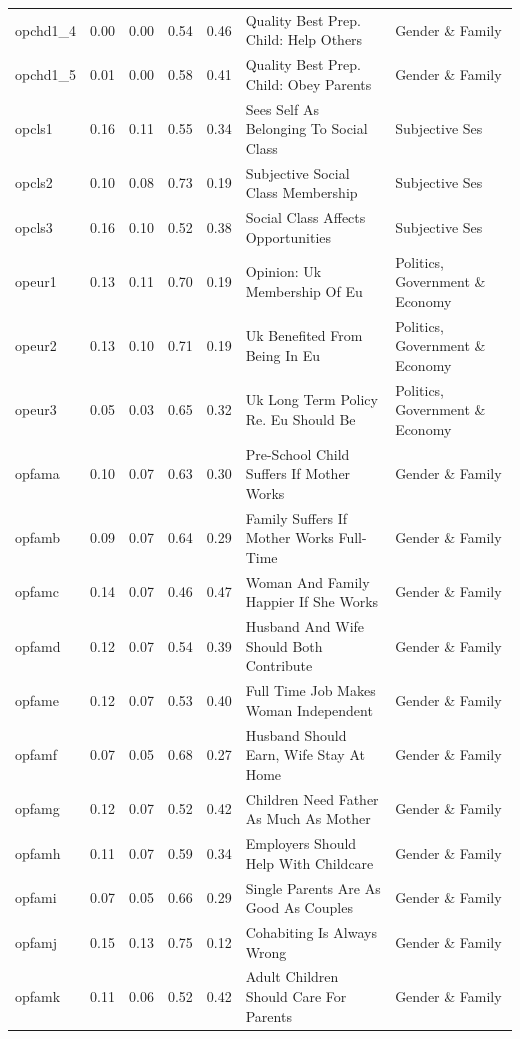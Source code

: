 \documentclass[
  12pt,
]{article}
\begin{document}
\begin{landscape}
\begin{scriptsize}
\begin{longtable}{|p{1.75in}|p{0.3in}|p{0.3in}|p{0.3in}|p{0.3in}|p{2.5in}|p{2.5in}}
opchd1\_4 & 0.00 & 0.00 & 0.54 & 0.46 & Quality Best Prep. Child: Help Others & Gender \& Family \\ 
opchd1\_5 & 0.01 & 0.00 & 0.58 & 0.41 & Quality Best Prep. Child: Obey Parents & Gender \& Family \\ 
opcls1 & 0.16 & 0.11 & 0.55 & 0.34 & Sees Self As Belonging To Social Class & Subjective Ses \\ 
opcls2 & 0.10 & 0.08 & 0.73 & 0.19 & Subjective Social Class Membership & Subjective Ses \\ 
opcls3 & 0.16 & 0.10 & 0.52 & 0.38 & Social Class Affects Opportunities & Subjective Ses \\ 
opeur1 & 0.13 & 0.11 & 0.70 & 0.19 & Opinion: Uk Membership Of Eu & Politics, Government \& Economy \\ 
opeur2 & 0.13 & 0.10 & 0.71 & 0.19 & Uk Benefited From Being In Eu & Politics, Government \& Economy \\ 
opeur3 & 0.05 & 0.03 & 0.65 & 0.32 & Uk Long Term Policy Re. Eu Should Be & Politics, Government \& Economy \\ 
opfama & 0.10 & 0.07 & 0.63 & 0.30 & Pre-School Child Suffers If Mother Works & Gender \& Family \\ 
opfamb & 0.09 & 0.07 & 0.64 & 0.29 & Family Suffers If Mother Works Full-Time & Gender \& Family \\ 
opfamc & 0.14 & 0.07 & 0.46 & 0.47 & Woman And Family Happier If She Works & Gender \& Family \\ 
opfamd & 0.12 & 0.07 & 0.54 & 0.39 & Husband And Wife Should Both Contribute & Gender \& Family \\ 
opfame & 0.12 & 0.07 & 0.53 & 0.40 & Full Time Job Makes Woman Independent & Gender \& Family \\ 
opfamf & 0.07 & 0.05 & 0.68 & 0.27 & Husband Should Earn, Wife Stay At Home & Gender \& Family \\ 
opfamg & 0.12 & 0.07 & 0.52 & 0.42 & Children Need Father As Much As Mother & Gender \& Family \\ 
opfamh & 0.11 & 0.07 & 0.59 & 0.34 & Employers Should Help With Childcare & Gender \& Family \\ 
opfami & 0.07 & 0.05 & 0.66 & 0.29 & Single Parents Are As Good As Couples & Gender \& Family \\ 
opfamj & 0.15 & 0.13 & 0.75 & 0.12 & Cohabiting Is Always Wrong & Gender \& Family \\ 
opfamk & 0.11 & 0.06 & 0.52 & 0.42 & Adult Children Should Care For Parents & Gender \& Family \\ 

\end{longtable}
\end{scriptsize}
\end{landscape}
\end{document}
